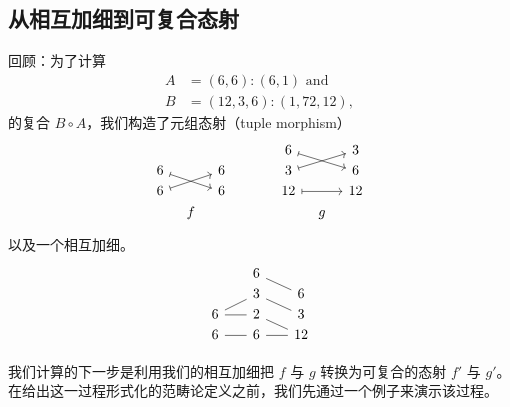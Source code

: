 \subsection{从相互加细到可复合态射}
回顾：为了计算
\begin{align*}
    A & = (6,6):(6,1) \text{ and }\\
    B & = (12,3,6):(1,72,12),
\end{align*}
的复合 $B \circ A$，我们构造了元组态射（tuple morphism）
\[ \begin{tikzcd} [row sep = 1, column sep = 8]
         & & & & & & 6 \ar[drr,mapsto] & & 3\\
        6 \ar[drr,mapsto] & & 6 & & & & 3 \ar[urr,mapsto] & & 6\\
        6 \ar[urr,mapsto] & & 6 & & & & 12 \ar[rr,mapsto] & & 12\\
        & f & & & & & & g & \\
        \end{tikzcd} \]
以及一个相互加细。
        \[ \begin{tikzcd} [row sep = 1, column sep = 8]
           & & 6 \ar[-,drr] & &  \\
          & & 3 \ar[-,drr] & & 6 \\
         6  \ar[-,urr] \ar[-,rr]  & & 2 \ar[-,drr] & & 3 \\
        6 \ar[rr,-] & & 6 \ar[-,swap,rr] & & 12 \\
           &  & &  &  \\
        \end{tikzcd} \]

\noindent 我们计算的下一步是利用我们的相互加细把 $f$ 与 $g$ 转换为可复合的态射 $f'$ 与 $g'$。在给出这一过程形式化的范畴论定义之前，我们先通过一个例子来演示该过程。


